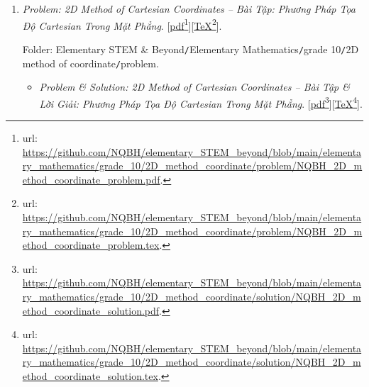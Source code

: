 \documentclass[12pt,oneside]{book}
\begin{document}
\begin{enumerate}
	Folder: {\sf Elementary STEM \& Beyond{\tt/}Elementary Mathematics{\tt/}grade 10{\tt/}probability \& statistics{\tt/}problem}.
	\begin{itemize}
		\item {\it Problem \& Solution: Probability \& Statistics -- Bài Tập \& Lời Giải: Xác Suất \& Thống Kê}. [\href{https://github.com/NQBH/elementary_STEM_beyond/blob/main/elementary_mathematics/grade_10/probability_statistics/solution/NQBH_probability_statistics_solution.pdf}{pdf}\footnote{{\sc url}: \url{https://github.com/NQBH/elementary_STEM_beyond/blob/main/elementary_mathematics/grade_10/probability_statistics/solution/NQBH_probability_statistics_solution.pdf}.}][\href{https://github.com/NQBH/elementary_STEM_beyond/blob/main/elementary_mathematics/grade_10/probability_statistics/solution/NQBH_probability_statistics_solution.tex}{\TeX}\footnote{{\sc url}: \url{https://github.com/NQBH/elementary_STEM_beyond/blob/main/elementary_mathematics/grade_10/probability_statistics/solution/NQBH_probability_statistics_solution.tex}.}].
		
		Folder: {\sf Elementary STEM \& Beyond{\tt/}Elementary Mathematics{\tt/}grade 10{\tt/}probability \& statistics{\tt/}solution}.
	\end{itemize}
	\item {\it Problem: 2D Method of Cartesian Coordinates -- Bài Tập: Phương Pháp Tọa Độ Cartesian Trong Mặt Phẳng}. [\href{https://github.com/NQBH/elementary_STEM_beyond/blob/main/elementary_mathematics/grade_10/2D_method_coordinate/problem/NQBH_2D_method_coordinate_problem.pdf}{pdf}\footnote{{\sc url}: \url{https://github.com/NQBH/elementary_STEM_beyond/blob/main/elementary_mathematics/grade_10/2D_method_coordinate/problem/NQBH_2D_method_coordinate_problem.pdf}.}][\href{https://github.com/NQBH/elementary_STEM_beyond/blob/main/elementary_mathematics/grade_10/2D_method_coordinate/problem/NQBH_2D_method_coordinate_problem.tex}{\TeX}\footnote{{\sc url}: \url{https://github.com/NQBH/elementary_STEM_beyond/blob/main/elementary_mathematics/grade_10/2D_method_coordinate/problem/NQBH_2D_method_coordinate_problem.tex}.}].
	
	Folder: {\sf Elementary STEM \& Beyond{\tt/}Elementary Mathematics{\tt/}grade 10{\tt/}2D method of coordinate{\tt/}problem}.
	\begin{itemize}
		\item {\it Problem \& Solution: 2D Method of Cartesian Coordinates -- Bài Tập \& Lời Giải: Phương Pháp Tọa Độ Cartesian Trong Mặt Phẳng}. [\href{https://github.com/NQBH/elementary_STEM_beyond/blob/main/elementary_mathematics/grade_10/2D_method_coordinate/solution/NQBH_2D_method_coordinate_solution.pdf}{pdf}\footnote{{\sc url}: \url{https://github.com/NQBH/elementary_STEM_beyond/blob/main/elementary_mathematics/grade_10/2D_method_coordinate/solution/NQBH_2D_method_coordinate_solution.pdf}.}][\href{https://github.com/NQBH/elementary_STEM_beyond/blob/main/elementary_mathematics/grade_10/2D_method_coordinate/solution/NQBH_2D_method_coordinate_solution.tex}{\TeX}\footnote{{\sc url}: \url{https://github.com/NQBH/elementary_STEM_beyond/blob/main/elementary_mathematics/grade_10/2D_method_coordinate/solution/NQBH_2D_method_coordinate_solution.tex}.}].
		

\end{itemize}
\end{enumerate}
\end{document}
